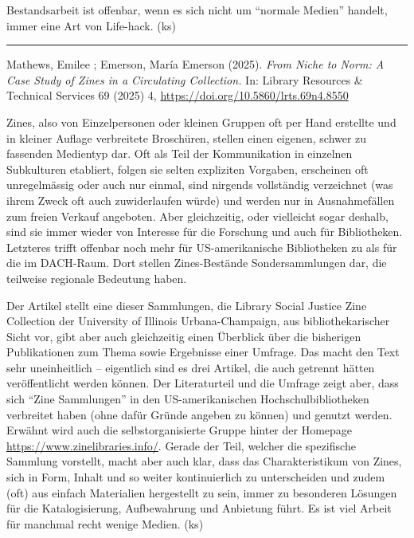 \documentclass[a4paper,
fontsize=11pt,
oneside,
numbers=noperiodatend,
parskip=half-,
bibliography=totoc,
final
]{scrartcl}
\begin{document}
Bestandsarbeit ist offenbar, wenn es sich nicht um \enquote{normale
Medien} handelt, immer eine Art von Life-hack. (ks)

\begin{center}\rule{0.5\linewidth}{0.5pt}\end{center}

Mathews, Emilee ; Emerson, María Emerson (2025). \emph{From Niche to
Norm: A Case Study of Zines in a Circulating Collection.} In: Library
Resources \& Technical Services 69 (2025) 4,
\url{https://doi.org/10.5860/lrts.69n4.8550}

Zines, also von Einzelpersonen oder kleinen Gruppen oft per Hand
erstellte und in kleiner Auflage verbreitete Broschüren, stellen einen
eigenen, schwer zu fassenden Medientyp dar. Oft als Teil der
Kommunikation in einzelnen Subkulturen etabliert, folgen sie selten
expliziten Vorgaben, erscheinen oft unregelmässig oder auch nur einmal,
sind nirgends vollständig verzeichnet (was ihrem Zweck oft auch
zuwiderlaufen würde) und werden nur in Ausnahmefällen zum freien Verkauf
angeboten. Aber gleichzeitig, oder vielleicht sogar deshalb, sind sie
immer wieder von Interesse für die Forschung und auch für Bibliotheken.
Letzteres trifft offenbar noch mehr für US-amerikanische Bibliotheken zu
als für die im DACH-Raum. Dort stellen Zines-Bestände Sondersammlungen
dar, die teilweise regionale Bedeutung haben.

Der Artikel stellt eine dieser Sammlungen, die Library Social Justice
Zine Collection der University of Illinois Urbana-Champaign, aus
bibliothekarischer Sicht vor, gibt aber auch gleichzeitig einen
Überblick über die bisherigen Publikationen zum Thema sowie Ergebnisse
einer Umfrage. Das macht den Text sehr uneinheitlich -- eigentlich sind
es drei Artikel, die auch getrennt hätten veröffentlicht werden können.
Der Literaturteil und die Umfrage zeigt aber, dass sich \enquote{Zine
Sammlungen} in den US-amerikanischen Hochschulbibliotheken verbreitet
haben (ohne dafür Gründe angeben zu können) und genutzt werden. Erwähnt
wird auch die selbstorganisierte Gruppe hinter der Homepage
\url{https://www.zinelibraries.info/}. Gerade der Teil, welcher die
spezifische Sammlung vorstellt, macht aber auch klar, dass das
Charakteristikum von Zines, sich in Form, Inhalt und so weiter
kontinuierlich zu unterscheiden und zudem (oft) aus einfach Materialien
hergestellt zu sein, immer zu besonderen Lösungen für die
Katalogisierung, Aufbewahrung und Anbietung führt. Es ist viel Arbeit
für manchmal recht wenige Medien. (ks)
\end{document}
